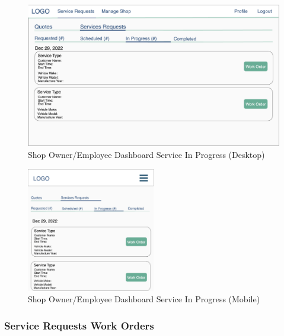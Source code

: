 \documentclass[12pt, titlepage]{article}
\begin{document}
\begin{figure}[H]
	\centering
	\includegraphics[width=\textwidth]{mockups/Shop Owner Dashboard (Service Requests - In Progress) (Desktop).png}
	\caption{Shop Owner/Employee Dashboard \textemdash{} Service \textemdash{} In Progress (Desktop)}
\end{figure}

\begin{figure}[H]
	\centering
	\includegraphics[width=0.5\textwidth]{mockups/Shop Owner Dashboard (Service Requests - In Progress) (Mobile).png}
	\caption{Shop Owner/Employee Dashboard \textemdash{} Service \textemdash{} In Progress (Mobile)}
\end{figure}

\subsubsection{Service Requests \textemdash{} Work Orders}
\end{document}
